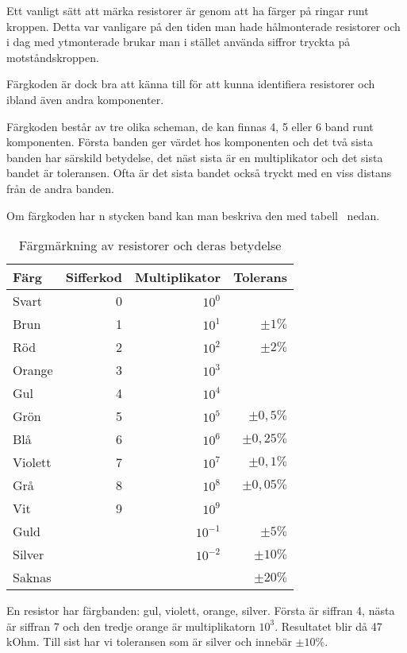 Ett vanligt sätt att märka resistorer är genom att ha färger på ringar runt
kroppen.
Detta var vanligare på den tiden man hade hålmonterade resistorer och i dag med
ytmonterade brukar man i stället använda siffror tryckta på motståndskroppen.

Färgkoden är dock bra att känna till för att kunna identifiera resistorer
och ibland även andra komponenter.

Färgkoden består av tre olika scheman, de kan finnas 4, 5 eller 6 band runt
komponenten.
Första banden ger värdet hos komponenten och det två sista banden har särskild
betydelse, det näst sista är en multiplikator och det sista bandet är
toleransen.
Ofta är det sista bandet också tryckt med en viss distans från de andra banden.

Om färgkoden har n stycken band kan man beskriva den med
tabell~ nedan.

\begin{table}[H]
\begin{tabular}{lrrr}
	\textbf{Färg}    & \textbf{Sifferkod} &     \textbf{Multiplikator} 
	&     \textbf{Tolerans} \\ \hline \hline
	Svart   &         0 &    $10^0$ &              \\ \hline
	Brun    &         1 &    $10^1$ &    $\pm 1\%$ \\ \hline
	Röd     &         2 &    $10^2$ &    $\pm 2\%$ \\ \hline
	Orange  &         3 &    $10^3$ &              \\ \hline
	Gul     &         4 &    $10^4$ &              \\ \hline
	Grön    &         5 &    $10^5$ &  $\pm 0,5\%$ \\ \hline
	Blå     &         6 &    $10^6$ & $\pm 0,25\%$ \\ \hline
	Violett &         7 &    $10^7$ &  $\pm 0,1\%$ \\ \hline
	Grå     &         8 &    $10^8$ & $\pm 0,05\%$ \\ \hline
	Vit     &         9 &    $10^9$ &              \\ \hline
	Guld    &           & $10^{-1}$ &    $\pm 5\%$ \\ \hline
	Silver  &           & $10^{-2}$ &   $\pm 10\%$ \\ \hline
	Saknas  &           &           &   $\pm 20\%$ \\ \hline
\end{tabular}
\caption{Färgmärkning av resistorer och deras betydelse}
\label{tab:rcolors}
\end{table}

\begin{exempelbox}
En resistor har färgbanden: gul, violett, orange, silver.
\tcblower
Första är siffran 4, nästa är siffran 7 och den tredje orange är
multiplikatorn $10^3$.
Resultatet blir då 47\,kOhm.
Till sist har vi toleransen som är silver och innebär $\pm 10\%$.
\end{exempelbox}
